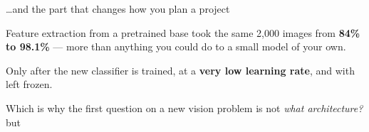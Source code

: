 \documentclass[aspectratio=169,11pt,t]{beamer}
\begin{document}
\begin{frame}[shrink=25]{\ldots{}and the part that changes how you plan a project}
\begin{minipage}[t]{0.494\textwidth}
\begin{icardgood}
Feature extraction from a pretrained base took the same 2,000 images from \textbf{84\% to 98.1\%} --- more than anything you could do to a small model of your own.
\end{icardgood}
\end{minipage}%
\hfill
\begin{minipage}[t]{0.494\textwidth}
\begin{icardaccent}
Only after the new classifier is trained, at a \textbf{very low learning rate}, and with  left frozen.
\end{icardaccent}
\end{minipage}%
\begin{iband}[signal]
Which is why the first question on a new vision problem is not \textit{what architecture?} but 
\end{iband}
\vskip 4pt
\vskip 2pt
\end{frame}
\end{document}
